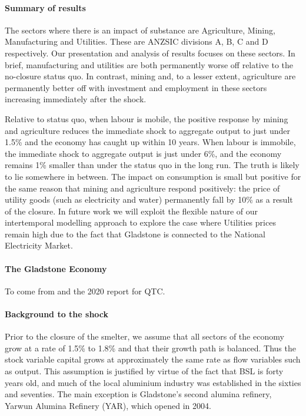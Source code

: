 \documentclass[12pt,a4paper]{article}
\begin{document}
\paragraph{Summary of results} The sectors where there is an impact of
substance are Agriculture, Mining, Manufacturing and Utilities. These are
ANZSIC divisions A, B, C and D respectively. Our presentation and analysis of
results focuses on these sectors.  In brief, manufacturing and utilities are
both permanently worse off relative to the no-closure status quo.  In contrast,
mining and, to a lesser extent, agriculture are permanently better off with
investment and employment in these sectors increasing immediately after the
shock.

Relative to status quo, when labour is mobile, the positive response by mining
and agriculture reduces the immediate shock to aggregate output to just under
1.5\% and the economy has caught up within 10 years.  When labour is immobile,
the immediate shock to aggregate output is just under 6\%, and the economy
remains 1\% smaller than under the status quo in the long run. The truth is
likely to lie somewhere in between. The impact on consumption is small but
positive for the same reason that mining and agriculture respond positively:
the price of utility goods (such as electricity and water) permanently fall by
10\% as a result of the closure. In future work we will exploit the flexible
nature of our intertemporal modelling approach to explore the case where
Utilities prices remain high due to the fact that Gladstone is connected to the
National Electricity Market.

\paragraph{The Gladstone Economy} To come from \cite{glad-prospectus} and
the 2020 report for QTC.

\paragraph{Background to the shock} Prior to the closure of the smelter, we
assume that all sectors of the economy grow at a rate of 1.5\% to 1.8\% and
that their growth path is balanced. Thus the stock variable capital grows at
approximately the same rate as flow variables such as output.  This assumption
is justified by virtue of the fact that BSL is forty years old, and much of the
local aluminium industry was established in the sixties and seventies.  The
main exception is Gladstone's second alumina refinery, Yarwun Alumina Refinery
(YAR), which opened in 2004.
\end{document}
